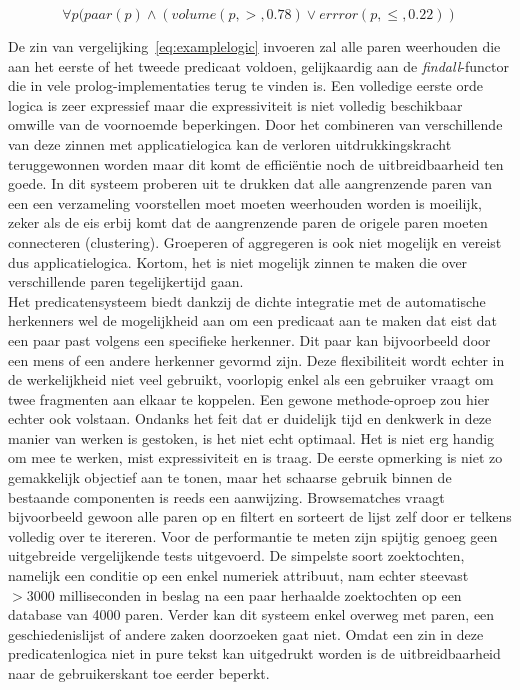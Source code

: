 \begin{equation}
\label{eq:examplelogic}
	\forall p (paar(p) \land (volume(p,>,0.78) \lor errror(p,\leq,0.22))
\end{equation}

De zin van vergelijking~\ref{eq:examplelogic} invoeren zal alle paren weerhouden die aan het eerste of het tweede predicaat voldoen, gelijkaardig aan de \emph{findall}-functor die in vele prolog-implementaties terug te vinden is. Een volledige eerste orde logica is zeer expressief maar die expressiviteit is niet volledig beschikbaar omwille van de voornoemde beperkingen. Door het combineren van verschillende van deze zinnen met applicatielogica kan de verloren uitdrukkingskracht teruggewonnen worden maar dit komt de effici\"entie noch de uitbreidbaarheid ten goede. In dit systeem proberen uit te drukken dat alle aangrenzende paren van een een verzameling voorstellen moet moeten weerhouden worden is moeilijk, zeker als de eis erbij komt dat de aangrenzende paren de origele paren moeten connecteren (clustering). Groeperen of aggregeren is ook niet mogelijk en vereist dus applicatielogica. Kortom, het is niet mogelijk zinnen te maken die over verschillende paren tegelijkertijd gaan.\\

Het predicatensysteem biedt dankzij de dichte integratie met de automatische herkenners wel de mogelijkheid aan om een predicaat aan te maken dat eist dat een paar past volgens een specifieke herkenner. Dit paar kan bijvoorbeeld door een mens of een andere herkenner gevormd zijn. Deze flexibiliteit wordt echter in de werkelijkheid niet veel gebruikt, voorlopig enkel als een gebruiker vraagt om twee fragmenten aan elkaar te koppelen. Een gewone methode-oproep zou hier echter ook volstaan. Ondanks het feit dat er duidelijk tijd en denkwerk in deze manier van werken is gestoken, is het niet echt optimaal. Het is niet erg handig om mee te werken, mist expressiviteit en is traag. De eerste opmerking is niet zo gemakkelijk objectief aan te tonen, maar het schaarse gebruik binnen de bestaande componenten is reeds een aanwijzing. Browsematches vraagt bijvoorbeeld gewoon alle paren op en filtert en sorteert de lijst zelf door er telkens volledig over te itereren. Voor de performantie te meten zijn spijtig genoeg geen uitgebreide vergelijkende tests uitgevoerd. De simpelste soort zoektochten, namelijk een conditie op een enkel numeriek attribuut, nam echter steevast $>3000$ milliseconden in beslag na een paar herhaalde zoektochten op een database van 4000 paren. Verder kan dit systeem enkel overweg met paren, een geschiedenislijst of andere zaken doorzoeken gaat niet. Omdat een zin in deze predicatenlogica niet in pure tekst kan uitgedrukt worden is de uitbreidbaarheid naar de gebruikerskant toe eerder beperkt.\\

